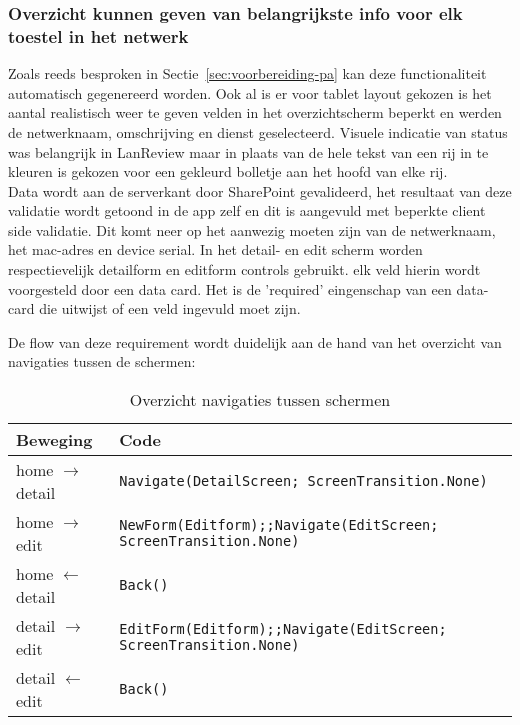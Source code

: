 \subsubsection{Overzicht kunnen geven van belangrijkste info voor elk toestel in het netwerk}

Zoals reeds besproken in Sectie~\ref{sec:voorbereiding-pa} kan deze functionaliteit automatisch gegenereerd worden. Ook al is er voor tablet layout gekozen is het aantal realistisch weer te geven velden in het overzichtscherm beperkt en werden de netwerknaam, omschrijving en dienst geselecteerd. Visuele indicatie van status was belangrijk in LanReview maar in plaats van de hele tekst van een rij in te kleuren is gekozen voor een gekleurd bolletje aan het hoofd van elke rij.\\
Data wordt aan de serverkant door SharePoint gevalideerd, het resultaat van deze validatie wordt getoond in de app zelf en dit is aangevuld met beperkte client side validatie. Dit komt neer op het aanwezig moeten zijn van de netwerknaam, het mac-adres en device serial. In het detail- en edit scherm worden respectievelijk detailform en editform controls gebruikt. elk veld hierin wordt voorgesteld door een data card. Het is de 'required' eingenschap van een data-card die uitwijst of een veld ingevuld moet zijn.

De flow van deze requirement wordt duidelijk aan de hand van het overzicht van navigaties tussen de schermen:\\
\begin{table}[h!]
    \begin{tabular}{|l|l|}
        \hline
        \textbf{Beweging}         & \textbf{Code}                                                   \\ \hline
        home $\rightarrow$ detail & \lstinline|Navigate(DetailScreen; ScreenTransition.None)|                   \\ \hline
        home $\rightarrow$ edit   & \lstinline|NewForm(Editform);;Navigate(EditScreen; ScreenTransition.None)|  \\ \hline
        home $\leftarrow$ detail  & \lstinline|Back()|                                                          \\ \hline
        detail $\rightarrow$ edit & \lstinline|EditForm(Editform);;Navigate(EditScreen; ScreenTransition.None)| \\ \hline
        detail $\leftarrow$ edit  & \lstinline|Back()|                                                          \\ \hline
    \end{tabular}
    \caption{Overzicht navigaties tussen schermen}
    \label{tab:app-flow}
\end{table}

